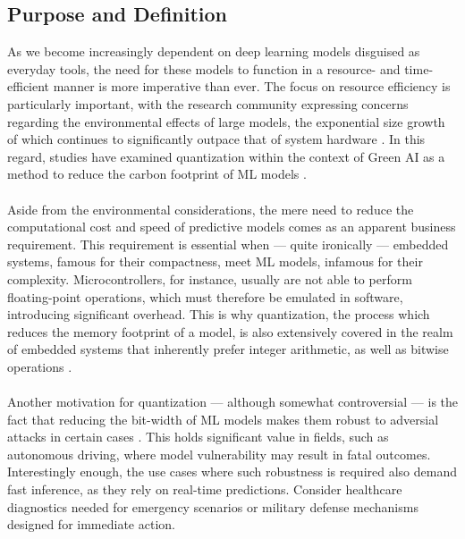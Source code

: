 \subsection{Purpose and Definition}
\label{subsec:purposeanddefinition}
As we become increasingly dependent on deep learning models disguised as everyday tools, 
the need for these models to function in a resource- and time-efficient manner is more imperative than ever. 
The focus on resource efficiency is particularly important, 
with the research community expressing concerns regarding the environmental effects of large models, 
the exponential size growth of which continues to significantly outpace that of system hardware \cite{DBLP:journals/corr/abs-2111-00364}. 
In this regard, studies have examined quantization within the context of Green AI as a method to reduce the carbon footprint of
ML models \cite{DBLP:journals/csi/RegueroMV25}.
\\
\\
Aside from the environmental considerations, the mere need to reduce 
the computational cost and speed of predictive models
comes as an apparent business requirement. 
This requirement is essential when — quite ironically — embedded systems, famous for their compactness, meet 
ML models, infamous for their complexity. Microcontrollers, for instance, 
usually are not able to perform floating-point operations, which must therefore be emulated in software, 
introducing significant overhead. This is why quantization, the process which reduces the memory footprint of a model,
is also extensively covered in the realm of embedded systems that 
inherently prefer integer arithmetic, as well as bitwise operations \cite{rastegari2016xnor} \cite{DBLP:conf/eccv/ZhangYYH18} \cite{DBLP:conf/codit/KhalifaM24}\cite{DBLP:journals/corr/abs-2105-13331}.
\\
\\
Another motivation for quantization — although somewhat controversial — is the fact that reducing the bit-width of
ML models makes them robust to adversial attacks in certain cases \cite{DBLP:journals/corr/abs-2404-05639}.
This holds significant value in fields, such as autonomous driving,
where model vulnerability may result in fatal outcomes.
Interestingly enough, the use cases where such robustness is required also demand fast inference, 
as they rely on real-time predictions. Consider healthcare diagnostics needed for emergency scenarios 
or military defense mechanisms designed for immediate action.
\\
\\
